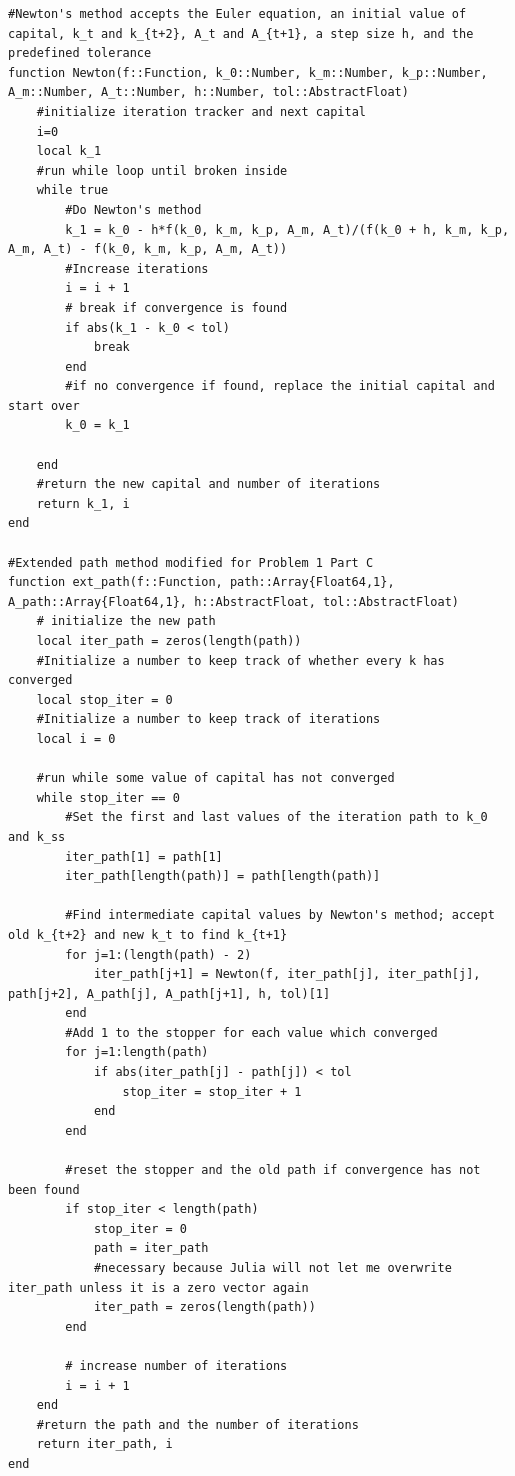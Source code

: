 \documentclass[12pt, letterpaper, parskip = full]{article}
\begin{document}
\begin{lstlisting}[breaklines]
#Newton's method accepts the Euler equation, an initial value of capital, k_t and k_{t+2}, A_t and A_{t+1}, a step size h, and the predefined tolerance
function Newton(f::Function, k_0::Number, k_m::Number, k_p::Number, A_m::Number, A_t::Number, h::Number, tol::AbstractFloat)
    #initialize iteration tracker and next capital
    i=0
    local k_1
    #run while loop until broken inside
    while true
        #Do Newton's method
        k_1 = k_0 - h*f(k_0, k_m, k_p, A_m, A_t)/(f(k_0 + h, k_m, k_p, A_m, A_t) - f(k_0, k_m, k_p, A_m, A_t))
        #Increase iterations
        i = i + 1
        # break if convergence is found
        if abs(k_1 - k_0 < tol)
            break
        end
        #if no convergence if found, replace the initial capital and start over
        k_0 = k_1

    end
    #return the new capital and number of iterations
    return k_1, i
end

#Extended path method modified for Problem 1 Part C
function ext_path(f::Function, path::Array{Float64,1}, A_path::Array{Float64,1}, h::AbstractFloat, tol::AbstractFloat)
    # initialize the new path
    local iter_path = zeros(length(path))
    #Initialize a number to keep track of whether every k has converged
    local stop_iter = 0
    #Initialize a number to keep track of iterations
    local i = 0

    #run while some value of capital has not converged
    while stop_iter == 0
        #Set the first and last values of the iteration path to k_0 and k_ss
        iter_path[1] = path[1]
        iter_path[length(path)] = path[length(path)]

        #Find intermediate capital values by Newton's method; accept old k_{t+2} and new k_t to find k_{t+1}
        for j=1:(length(path) - 2)
            iter_path[j+1] = Newton(f, iter_path[j], iter_path[j], path[j+2], A_path[j], A_path[j+1], h, tol)[1]
        end
        #Add 1 to the stopper for each value which converged
        for j=1:length(path)
            if abs(iter_path[j] - path[j]) < tol
                stop_iter = stop_iter + 1
            end
        end

        #reset the stopper and the old path if convergence has not been found
        if stop_iter < length(path)
            stop_iter = 0
            path = iter_path
            #necessary because Julia will not let me overwrite iter_path unless it is a zero vector again
            iter_path = zeros(length(path))
        end

        # increase number of iterations
        i = i + 1
    end
    #return the path and the number of iterations
    return iter_path, i
end



\end{lstlisting}
\end{document}
